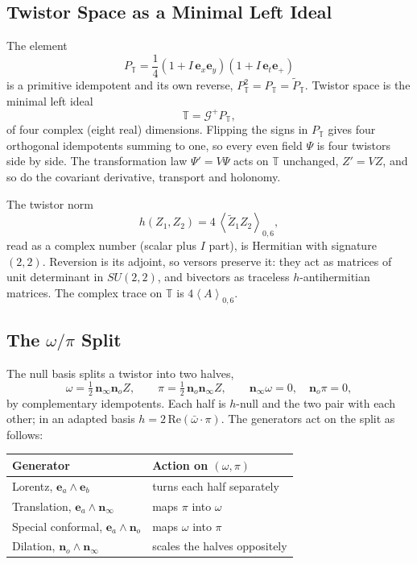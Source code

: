 \documentclass[11pt,a4paper]{article}
\newcommand{\T}{\mathbb{T}}
\newcommand{\G}{\mathcal{G}}
\newcommand{\nzero}{\mathbf{n}_o}
\newcommand{\ninf}{\mathbf{n}_\infty}
\newcommand{\e}{\mathbf{e}}
\newcommand{\wedgeprod}{\mathbin{\wedge}}
\newcommand{\rev}[1]{\widetilde{#1}}
\newcommand{\grade}[2]{\left\langle #1\right\rangle_{#2}}
\begin{document}
\subsection{Twistor Space as a Minimal Left Ideal}

The element
\[
    P_{\T}=\frac14\left(1+I\,\e_x\e_y\right)\left(1+I\,\e_t\e_+\right)
\]
is a primitive idempotent and its own reverse,
\(P_{\T}^2=P_{\T}=\rev{P}_{\T}\). Twistor space is the minimal left
ideal
\[
    \boxed{
        \T=\G^{+}P_{\T},
    }
\]
of four complex (eight real) dimensions. Flipping the signs in
\(P_{\T}\) gives four orthogonal idempotents summing to one, so every
even field \(\Psi\) is four twistors side by side. The transformation
law \(\Psi'=V\Psi\) acts on \(\T\) unchanged, \(Z'=VZ\), and so do the
covariant derivative, transport and holonomy.

The twistor norm
\[
    h(Z_1,Z_2)=4\,\grade{\rev{Z}_1Z_2}{0,6},
\]
read as a complex number (scalar plus \(I\) part), is Hermitian with
signature \((2,2)\). Reversion is its adjoint, so versors preserve it:
they act as matrices of unit determinant in \(SU(2,2)\), and bivectors
as traceless \(h\)-antihermitian matrices. The complex trace on \(\T\)
is \(4\grade{A}{0,6}\).

\subsection{The \texorpdfstring{\(\omega/\pi\)}{omega/pi} Split}

The null basis splits a twistor into two halves,
\[
    \omega=\tfrac12\,\ninf\nzero Z,
    \qquad
    \pi=\tfrac12\,\nzero\ninf Z,
    \qquad
    \ninf\omega=0,\quad\nzero\pi=0,
\]
by complementary idempotents. Each half is \(h\)-null and the two pair
with each other; in an adapted basis
\(h=2\,\mathrm{Re}(\bar\omega\cdot\pi)\). The generators act on the
split as follows:

\begin{center}
\begin{tabular}{ll}
    \toprule
    Generator & Action on \((\omega,\pi)\)\\
    \midrule
    Lorentz, \(\e_a\wedgeprod\e_b\) & turns each half separately\\
    Translation, \(\e_a\wedgeprod\ninf\) & maps \(\pi\) into \(\omega\)\\
    Special conformal, \(\e_a\wedgeprod\nzero\) & maps \(\omega\) into
        \(\pi\)\\
    Dilation, \(\nzero\wedgeprod\ninf\) & scales the halves oppositely\\
    \bottomrule
\end{tabular}
\end{center}
\end{document}
